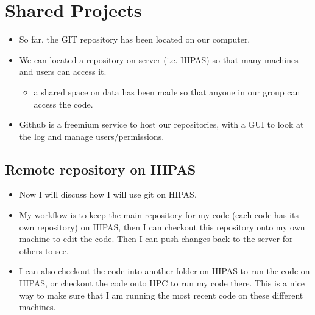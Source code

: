 \documentclass{beamer}
\begin{document}
%
%
%
%
%
\section{Shared Projects}

\begin{frame}
\begin{itemize}
	\item So far, the GIT repository has been located on our computer.
	\item We can located a repository on server (i.e. HIPAS) so that many machines and users can access it.
	\begin{itemize}
		\item	a shared space on data has been made so that anyone in our group can access the code.
	\end{itemize}
	\item Github is a freemium service to host our repositories, with a GUI to look at the log and manage users/permissions.
\end{itemize}
\end{frame}


%
%
%
\subsection{Remote repository on HIPAS}

\begin{frame}
\begin{itemize}
	\item Now I will discuss how I will use git on HIPAS. 
	\item My workflow is to keep the main repository for my code (each code has its own repository) on HIPAS,
	 then I can \alert{checkout} this repository onto my own machine to edit the code. Then I can \alert{push}
	 changes back to the server for others to see. 
	\item I can also \alert{checkout} the code into another folder on HIPAS to run the code on HIPAS, or 
	\alert{checkout} the code onto HPC to run my code there. This is a nice way to make sure that I am 
	running the most recent code on these different machines.
\end{itemize}
\end{frame}
\end{document}
